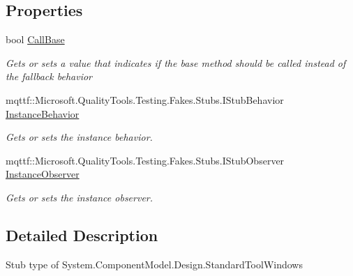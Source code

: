 \subsection*{Properties}
\begin{DoxyCompactItemize}
\item 
bool \hyperlink{class_system_1_1_component_model_1_1_design_1_1_fakes_1_1_stub_standard_tool_windows_ad3a831f1ef410bfceab1bc7899c4d875}{Call\-Base}
\begin{DoxyCompactList}\small\item\em Gets or sets a value that indicates if the base method should be called instead of the fallback behavior\end{DoxyCompactList}\item 
mqttf\-::\-Microsoft.\-Quality\-Tools.\-Testing.\-Fakes.\-Stubs.\-I\-Stub\-Behavior \hyperlink{class_system_1_1_component_model_1_1_design_1_1_fakes_1_1_stub_standard_tool_windows_ad37cc28c6b4e18313d970ed9cab45630}{Instance\-Behavior}
\begin{DoxyCompactList}\small\item\em Gets or sets the instance behavior.\end{DoxyCompactList}\item 
mqttf\-::\-Microsoft.\-Quality\-Tools.\-Testing.\-Fakes.\-Stubs.\-I\-Stub\-Observer \hyperlink{class_system_1_1_component_model_1_1_design_1_1_fakes_1_1_stub_standard_tool_windows_ad6e89311ae3e844b5fde700754e2d25d}{Instance\-Observer}
\begin{DoxyCompactList}\small\item\em Gets or sets the instance observer.\end{DoxyCompactList}\end{DoxyCompactItemize}


\subsection{Detailed Description}
Stub type of System.\-Component\-Model.\-Design.\-Standard\-Tool\-Windows



